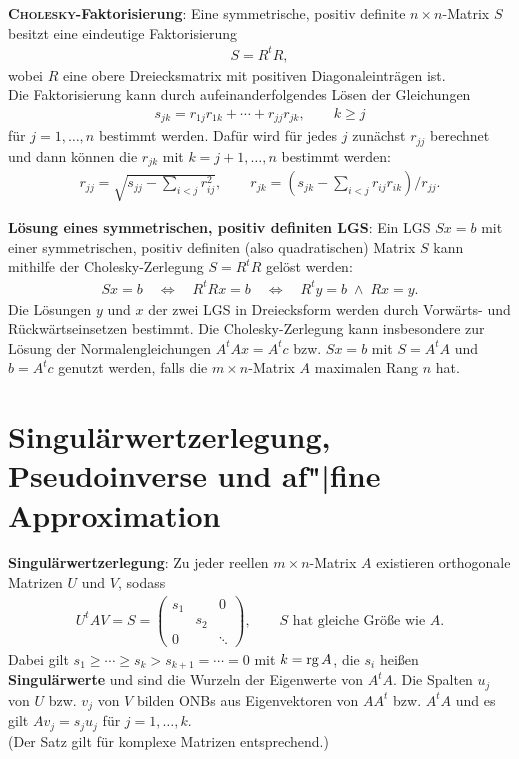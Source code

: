 \textbf{\textsc{Cholesky}-Faktorisierung}:
Eine symmetrische, positiv definite $n \times n$-Matrix $S$ besitzt eine
eindeutige Faktorisierung
\begin{align*}
    S = R^t R,
\end{align*}
wobei $R$ eine obere Dreiecksmatrix mit positiven Diagonaleinträgen ist. \\
Die Faktorisierung kann durch aufeinanderfolgendes Lösen der Gleichungen
\begin{align*}
    s_{jk} = r_{1j} r_{1k} + \dotsb + r_{jj} r_{jk}, \qquad k \ge j
\end{align*}
für $j = 1, \dotsc, n$ bestimmt werden.
Dafür wird für jedes $j$ zunächst $r_{jj}$
berechnet und dann können die $r_{jk}$ mit $k = j + 1, \dotsc, n$
bestimmt werden:
\begin{align*}
    r_{jj} = \sqrt{s_{jj} - \sum_{i < j} r_{ij}^2}, \qquad
    r_{jk} = \left(s_{jk} - \sum_{i < j} r_{ij} r_{ik}\right) / r_{jj}.
\end{align*}

\linie

\textbf{Lösung eines symmetrischen, positiv definiten LGS}:
Ein LGS $Sx = b$ mit einer symmetrischen, positiv definiten
(also quadratischen) Matrix $S$ kann mithilfe der Cholesky-Zerlegung
$S = R^t R$ gelöst werden:
\begin{align*}
    Sx = b \quad\Leftrightarrow\quad
    R^t Rx = b \quad\Leftrightarrow\quad
    R^t y = b \;\land\; Rx = y.
\end{align*}
Die Lösungen $y$ und $x$ der zwei LGS in Dreiecksform werden durch
Vorwärts- und Rückwärtseinsetzen bestimmt.
Die Cholesky-Zerlegung kann insbesondere zur Lösung der Normalengleichungen
$A^t Ax = A^t c$ bzw. $Sx = b$ mit $S = A^t A$ und $b = A^t c$ genutzt werden,
falls die $m \times n$-Matrix $A$ maximalen Rang $n$ hat.

\section{%
    Singulärwertzerlegung, Pseudoinverse und af"|fine Approximation%
}

\textbf{Singulärwertzerlegung}:
Zu jeder reellen $m \times n$-Matrix $A$ existieren orthogonale Matrizen $U$
und $V$, sodass
\begin{align*}
    U^t A V = S =
    \begin{pmatrix}s_1 & & 0 \\ & s_2 & \\ 0 & & \ddots\end{pmatrix}, \qquad
    S \text{ hat gleiche Größe wie } A.
\end{align*}
Dabei gilt $s_1 \ge \dotsb \ge s_k > s_{k+1} = \dotsb = 0$
mit $k = \operatorname{rg} A$,
die $s_i$ heißen \textbf{Singulärwerte} und sind die Wurzeln der Eigenwerte
von $A^t A$.
Die Spalten $u_j$ von $U$ bzw. $v_j$ von $V$ bilden ONBs aus Eigenvektoren
von $A A^t$ bzw. $A^t A$ und es gilt
$A v_j = s_j u_j$ für $j = 1, \dotsc, k$. \\
(Der Satz gilt für komplexe Matrizen entsprechend.)

